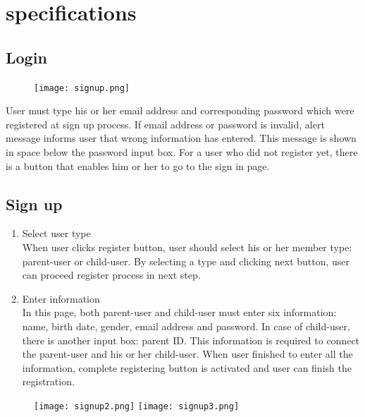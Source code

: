 \documentclass[conference]{IEEEtran}
\begin{document}
\newpage
\section{\large{specifications}}

\subsection{Login}
\begin{figure}[H]
    \centering
    \texttt{[image: signup.png]}
    \end{figure}
    User must type his or her email address and corresponding password which were registered at sign up process. If email address or password is invalid, alert message informs user that wrong information has entered. This message is shown in space below the password input box. For a user who did not register yet, there is a button that enables him or her to go to the sign in page.
    
\subsection{Sign up}
    \begin{enumerate}
    \item Select user type\\
    When user clicks register button, user should select his or her member type: parent-user or child-user. By selecting a type and clicking next button, user can proceed register process in next step.\\
    \item Enter information\\
    In this page, both parent-user and child-user must enter six information: name, birth date, gender, email address and password. In case of child-user, there is another input box: parent ID. This information is required to connect the parent-user and his or her child-user. When user finished to enter all the information, complete registering button is activated and user can finish the registration.
    \end{enumerate}
    \begin{figure}[H]
    \centering
    \texttt{[image: signup2.png]}
    \texttt{[image: signup3.png]}
    \end{figure}
    
\end{document}
